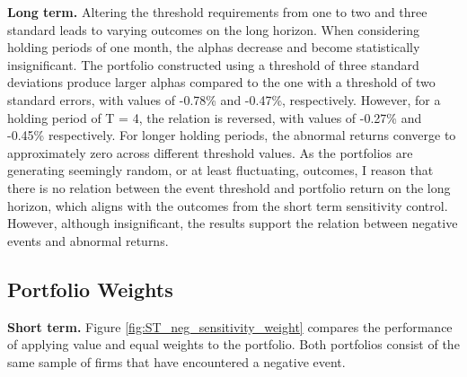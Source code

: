 \noindent \textbf{Long term.} Altering the threshold requirements from one to two and three standard leads to varying outcomes on the long horizon. When considering holding periods of one month, the alphas decrease and become statistically insignificant. The portfolio constructed using a threshold of three standard deviations produce larger alphas compared to the one with a threshold of two standard errors, with values of -0.78\% and -0.47\%, respectively. However, for a holding period of T = 4, the relation is reversed, with values of -0.27\% and -0.45\% respectively. For longer holding periods, the abnormal returns converge to approximately zero across different threshold values. As the portfolios are generating seemingly random, or at least fluctuating, outcomes, I reason that there is no relation between the event threshold and portfolio return on the long horizon, which aligns with the outcomes from the short term sensitivity control. However, although insignificant, the results support the relation between negative events and abnormal returns.  


 
\subsection{Portfolio Weights} \label{sec: sens_st_weights}

\textbf{Short term.} Figure \ref{fig:ST_neg_sensitivity_weight} compares the performance of applying value and equal weights to the portfolio. Both portfolios consist of the same sample of firms that have encountered a negative event. 

